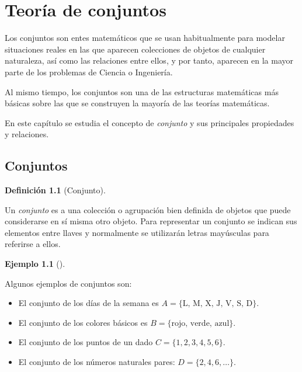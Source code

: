 \documentclass[
  a4paper,
]{scrreport}
\providecommand{\tightlist}{%
  \setlength{\itemsep}{0pt}\setlength{\parskip}{0pt}}\usepackage{longtable,booktabs,array}
\theoremstyle{definition}
\newtheorem{example}{Ejemplo}[chapter]
\theoremstyle{plain}
\theoremstyle{definition}
\newtheorem{definition}{Definición}[chapter]
\theoremstyle{plain}
\theoremstyle{plain}
\theoremstyle{remark}
\begin{document}

\hypertarget{teoruxeda-de-conjuntos}{%
\chapter{Teoría de conjuntos}\label{teoruxeda-de-conjuntos}}

Los conjuntos son entes matemáticos que se usan habitualmente para
modelar situaciones reales en las que aparecen colecciones de objetos de
cualquier naturaleza, así como las relaciones entre ellos, y por tanto,
aparecen en la mayor parte de los problemas de Ciencia o Ingeniería.

Al mismo tiempo, los conjuntos son una de las estructuras matemáticas
más básicas sobre las que se construyen la mayoría de las teorías
matemáticas.

En este capítulo se estudia el concepto de \emph{conjunto} y sus
principales propiedades y relaciones.

\hypertarget{conjuntos}{%
\section{Conjuntos}\label{conjuntos}}

\leavevmode{}%
\begin{definition}[Conjunto]\label{def-conjunto}

Un \emph{conjunto} es a una colección o agrupación bien definida de
objetos que puede considerarse en sí misma otro objeto. Para representar
un conjunto se indican sus elementos entre llaves y normalmente se
utilizarán letras mayúsculas para referirse a ellos.

\end{definition}

\leavevmode{}%
\begin{example}[]\label{exm-conjuntos}

Algunos ejemplos de conjuntos son:

\begin{itemize}
\tightlist
\item
  El conjunto de los días de la semana es
  \(A = \{\mbox{L, M, X, J, V, S, D}\}\).
\item
  El conjunto de los colores básicos es
  \(B = \{\mbox{rojo, verde, azul}\}\).
\item
  El conjunto de los puntos de un dado \(C = \{ 1, 2, 3, 4, 5, 6 \}\).
\item
  El conjunto de los números naturales pares:
  \(D = \{2, 4, 6, \ldots \}\).
\end{itemize}

\end{example}
\end{document}
